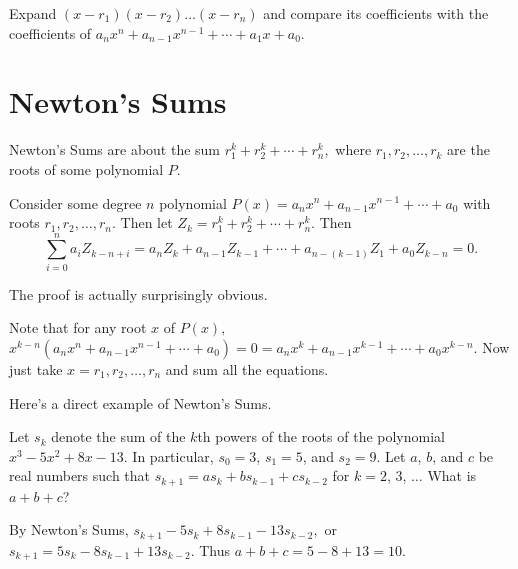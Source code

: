 \documentclass[mast]{lucky}
\begin{document}
\begin{pro}
Expand $(x-r_1)(x-r_2)\ldots(x-r_n)$ and compare its coefficients with the coefficients of $a_nx^n+a_{n-1}x^{n-1}+\cdots+a_{1}x+a_0.$
\end{pro}

\section{Newton's Sums}

Newton's Sums are about the sum $r_1^k+r_2^k+\cdots+r_n^k,$ where $r_1,r_2,\ldots,r_k$ are the roots of some polynomial $P.$

\begin{theo}
Consider some degree $n$ polynomial $P(x)=a_nx^n+a_{n-1}x^{n-1}+\cdots+a_0$ with roots $r_1,r_2,\ldots,r_n.$ Then let $Z_k=r_1^k+r_2^k+\cdots+r_n^k.$ Then
\[\sum_{i=0}^{n}a_iZ_{k-n+i}=a_nZ_k+a_{n-1}Z_{k-1}+\cdots+a_{n-(k-1)}Z_1+a_{0}Z_{k-n}=0.\]
\end{theo}

The proof is actually surprisingly obvious.

\begin{pro}
Note that for any root $x$ of $P(x),$ $x^{k-n}(a_nx^n+a_{n-1}x^{n-1}+\cdots+a_0)=0=a_nx^k+a_{n-1}x^{k-1}+\cdots+a_0x^{k-n}.$ Now just take $x=r_1,r_2,\ldots,r_n$ and sum all the equations.
\end{pro}

Here's a direct example of Newton's Sums.

\begin{exam}[AMC 12A 2019/17]
Let $s_k$ denote the sum of the $\textit{k}$th powers of the roots of the polynomial $x^3-5x^2+8x-13$. In particular, $s_0=3$, $s_1=5$, and $s_2=9$. Let $a$, $b$, and $c$ be real numbers such that $s_{k+1} = as_k + bs_{k-1} + cs_{k-2}$ for $k=2$, $3$, $\ldots$ What is $a+b+c$?
\end{exam}


\begin{sol}
By Newton's Sums, $s_{k+1}-5s_k+8s_{k-1}-13s_{k-2},$ or $s_{k+1}=5s_k-8s_{k-1}+13s_{k-2}.$ Thus $a+b+c=5-8+13=10.$
\end{sol}

\pagebreak

\end{document}
